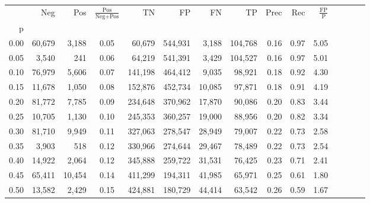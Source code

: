 \begin{tabular}{rrrcrrrrrrrrrrr}
\toprule
{} &     Neg &     Pos & $\frac{\text{Pos}}{\text{Neg}+\text{Pos}}$ &       TN &       FP &       FN &       TP &  Prec &   Rec & $\frac{\text{FP}}{\text{P}}$ \\
p    &         &         &                                            &          &          &          &          &       &       &                              \\
\midrule
0.00 &  60,679 &   3,188 &                                       0.05 &   60,679 &  544,931 &    3,188 &  104,768 &  0.16 &  0.97 &                         5.05 \\
0.05 &   3,540 &     241 &                                       0.06 &   64,219 &  541,391 &    3,429 &  104,527 &  0.16 &  0.97 &                         5.01 \\
0.10 &  76,979 &   5,606 &                                       0.07 &  141,198 &  464,412 &    9,035 &   98,921 &  0.18 &  0.92 &                         4.30 \\
0.15 &  11,678 &   1,050 &                                       0.08 &  152,876 &  452,734 &   10,085 &   97,871 &  0.18 &  0.91 &                         4.19 \\
0.20 &  81,772 &   7,785 &                                       0.09 &  234,648 &  370,962 &   17,870 &   90,086 &  0.20 &  0.83 &                         3.44 \\
0.25 &  10,705 &   1,130 &                                       0.10 &  245,353 &  360,257 &   19,000 &   88,956 &  0.20 &  0.82 &                         3.34 \\
0.30 &  81,710 &   9,949 &                                       0.11 &  327,063 &  278,547 &   28,949 &   79,007 &  0.22 &  0.73 &                         2.58 \\
0.35 &   3,903 &     518 &                                       0.12 &  330,966 &  274,644 &   29,467 &   78,489 &  0.22 &  0.73 &                         2.54 \\
0.40 &  14,922 &   2,064 &                                       0.12 &  345,888 &  259,722 &   31,531 &   76,425 &  0.23 &  0.71 &                         2.41 \\
0.45 &  65,411 &  10,454 &                                       0.14 &  411,299 &  194,311 &   41,985 &   65,971 &  0.25 &  0.61 &                         1.80 \\
0.50 &  13,582 &   2,429 &                                       0.15 &  424,881 &  180,729 &   44,414 &   63,542 &  0.26 &  0.59 &                         1.67 \\

\end{tabular}
